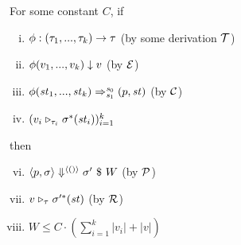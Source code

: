 \begin{lem}
	\label{function-correctness}
	For some constant $C$, if 
	\begin{enumerate}[(i)]
	\item $\Typef{\hcall}{\replc{k}{\tau}}\tau$ (by some derivation $\MT$)
	\item $\EvalF{\hcall}{\replc{k}{v}}{v}$ (by $\ME$)
	\item $\Transf{\hcall}{\replc k {\st}} {\s_0} {\s_1} {\sfun{p}{\st}}$ (by $\MC$)
 	\item $(\ValRep{v_i}{\tau_i}{\sgm^*(\st_i)})^k_{i=1}$

	\end{enumerate}
 	then 
 	\begin{enumerate}[(i)]
 		\setcounter{enumi}{5}
 		\item $\seval{p}{\sgm}{\vunit}{\sgm'}{W}$ (by $\MP$)
 		\item $\ValRep{v}{\tau}{\sgm'^*(\st)}$ (by $\MR$)
 		\item $W \le C \cdot (\sum_{i=1}^{k}|v_i| + |v|)$ 

 	\end{enumerate}
\end{lem}

